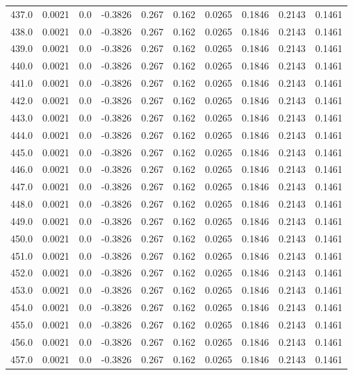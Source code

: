 \begin{longtable}{lrrrrrrrrr}
437.0 & 0.0021 & 0.0 & -0.3826 & 0.267 & 0.162 & 0.0265 & 0.1846 & 0.2143 & 0.1461 \\
438.0 & 0.0021 & 0.0 & -0.3826 & 0.267 & 0.162 & 0.0265 & 0.1846 & 0.2143 & 0.1461 \\
439.0 & 0.0021 & 0.0 & -0.3826 & 0.267 & 0.162 & 0.0265 & 0.1846 & 0.2143 & 0.1461 \\
440.0 & 0.0021 & 0.0 & -0.3826 & 0.267 & 0.162 & 0.0265 & 0.1846 & 0.2143 & 0.1461 \\
441.0 & 0.0021 & 0.0 & -0.3826 & 0.267 & 0.162 & 0.0265 & 0.1846 & 0.2143 & 0.1461 \\
442.0 & 0.0021 & 0.0 & -0.3826 & 0.267 & 0.162 & 0.0265 & 0.1846 & 0.2143 & 0.1461 \\
443.0 & 0.0021 & 0.0 & -0.3826 & 0.267 & 0.162 & 0.0265 & 0.1846 & 0.2143 & 0.1461 \\
444.0 & 0.0021 & 0.0 & -0.3826 & 0.267 & 0.162 & 0.0265 & 0.1846 & 0.2143 & 0.1461 \\
445.0 & 0.0021 & 0.0 & -0.3826 & 0.267 & 0.162 & 0.0265 & 0.1846 & 0.2143 & 0.1461 \\
446.0 & 0.0021 & 0.0 & -0.3826 & 0.267 & 0.162 & 0.0265 & 0.1846 & 0.2143 & 0.1461 \\
447.0 & 0.0021 & 0.0 & -0.3826 & 0.267 & 0.162 & 0.0265 & 0.1846 & 0.2143 & 0.1461 \\
448.0 & 0.0021 & 0.0 & -0.3826 & 0.267 & 0.162 & 0.0265 & 0.1846 & 0.2143 & 0.1461 \\
449.0 & 0.0021 & 0.0 & -0.3826 & 0.267 & 0.162 & 0.0265 & 0.1846 & 0.2143 & 0.1461 \\
450.0 & 0.0021 & 0.0 & -0.3826 & 0.267 & 0.162 & 0.0265 & 0.1846 & 0.2143 & 0.1461 \\
451.0 & 0.0021 & 0.0 & -0.3826 & 0.267 & 0.162 & 0.0265 & 0.1846 & 0.2143 & 0.1461 \\
452.0 & 0.0021 & 0.0 & -0.3826 & 0.267 & 0.162 & 0.0265 & 0.1846 & 0.2143 & 0.1461 \\
453.0 & 0.0021 & 0.0 & -0.3826 & 0.267 & 0.162 & 0.0265 & 0.1846 & 0.2143 & 0.1461 \\
454.0 & 0.0021 & 0.0 & -0.3826 & 0.267 & 0.162 & 0.0265 & 0.1846 & 0.2143 & 0.1461 \\
455.0 & 0.0021 & 0.0 & -0.3826 & 0.267 & 0.162 & 0.0265 & 0.1846 & 0.2143 & 0.1461 \\
456.0 & 0.0021 & 0.0 & -0.3826 & 0.267 & 0.162 & 0.0265 & 0.1846 & 0.2143 & 0.1461 \\
457.0 & 0.0021 & 0.0 & -0.3826 & 0.267 & 0.162 & 0.0265 & 0.1846 & 0.2143 & 0.1461 \\

\end{longtable}
